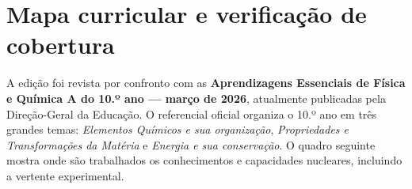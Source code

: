 \documentclass[11pt,a4paper,oneside]{book}
\begin{document}
\chapter*{Mapa curricular e verificação de cobertura}

\begin{curriculo}
A edição foi revista por confronto com as \textbf{Aprendizagens Essenciais de Física e Química A do 10.º ano — março de 2026}, atualmente publicadas pela Direção-Geral da Educação. O referencial oficial organiza o 10.º ano em três grandes temas: \textit{Elementos Químicos e sua organização}, \textit{Propriedades e Transformações da Matéria} e \textit{Energia e sua conservação}. O quadro seguinte mostra onde são trabalhados os conhecimentos e capacidades nucleares, incluindo a vertente experimental.
\end{curriculo}
\end{document}

